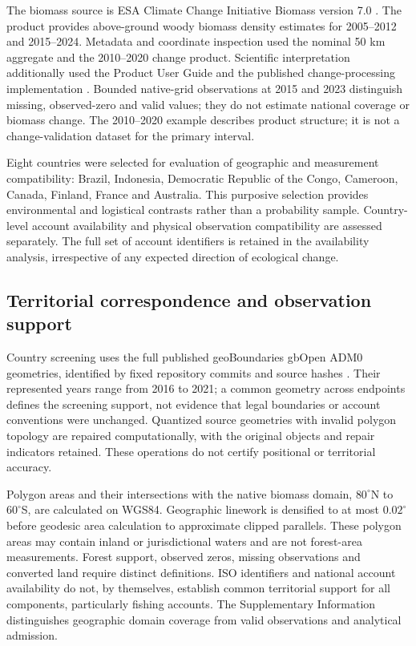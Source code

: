 \documentclass[11pt,a4paper]{article}
\begin{document}
The biomass source is ESA Climate Change Initiative Biomass version 7.0 \citep{SantoroCartus2026}. The product provides above-ground woody biomass density estimates for 2005--2012 and 2015--2024. Metadata and coordinate inspection used the nominal 50 km aggregate and the 2010--2020 change product. Scientific interpretation additionally used the Product User Guide and the published change-processing implementation \citep{PUG2026}. Bounded native-grid observations at 2015 and 2023 distinguish missing, observed-zero and valid values; they do not estimate national coverage or biomass change. The 2010--2020 example describes product structure; it is not a change-validation dataset for the primary interval.

Eight countries were selected for evaluation of geographic and measurement compatibility: Brazil, Indonesia, Democratic Republic of the Congo, Cameroon, Canada, Finland, France and Australia. This purposive selection provides environmental and logistical contrasts rather than a probability sample. Country-level account availability and physical observation compatibility are assessed separately. The full set of account identifiers is retained in the availability analysis, irrespective of any expected direction of ecological change.

\subsection{Territorial correspondence and observation support}
Country screening uses the full published geoBoundaries gbOpen ADM0 geometries, identified by fixed repository commits and source hashes \citep{Runfola2020}. Their represented years range from 2016 to 2021; a common geometry across endpoints defines the screening support, not evidence that legal boundaries or account conventions were unchanged. Quantized source geometries with invalid polygon topology are repaired computationally, with the original objects and repair indicators retained. These operations do not certify positional or territorial accuracy.

Polygon areas and their intersections with the native biomass domain, $80^\circ$N to $60^\circ$S, are calculated on WGS84. Geographic linework is densified to at most $0.02^\circ$ before geodesic area calculation to approximate clipped parallels. These polygon areas may contain inland or jurisdictional waters and are not forest-area measurements. Forest support, observed zeros, missing observations and converted land require distinct definitions. ISO identifiers and national account availability do not, by themselves, establish common territorial support for all components, particularly fishing accounts. The Supplementary Information distinguishes geographic domain coverage from valid observations and analytical admission.
\end{document}
